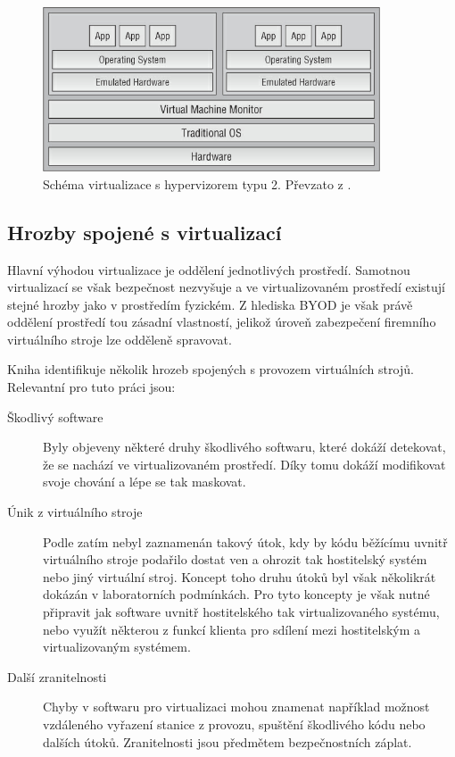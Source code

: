 \begin{figure}[h!]
\centering
\includegraphics[width=10cm]{img/shackleford2}
\caption{Schéma virtualizace s hypervizorem typu 2. Převzato z \cite{Shackleford}.} 
\end{figure}

\subsection{Hrozby spojené s virtualizací}
Hlavní výhodou virtualizace je oddělení jednotlivých prostředí. Samotnou virtualizací se však bezpečnost nezvyšuje a ve virtualizovaném prostředí existují stejné hrozby jako v prostředím fyzickém. Z hlediska BYOD je však právě oddělení prostředí tou zásadní vlastností, jelikož úroveň zabezpečení firemního virtuálního stroje lze odděleně spravovat.

Kniha \cite{Shackleford} identifikuje několik hrozeb spojených s provozem virtuálních strojů. Relevantní pro tuto práci jsou:

\begin{description}
  \item[Škodlivý software] Byly objeveny některé druhy škodlivého softwaru, které dokáží detekovat, že se nachází ve virtualizovaném prostředí. Díky tomu dokáží modifikovat svoje chování a lépe se tak maskovat.
  \item[Únik z virtuálního stroje] Podle \cite{Shackleford} zatím nebyl zaznamenán takový útok, kdy by kódu běžícímu uvnitř virtuálního stroje podařilo dostat ven a ohrozit tak hostitelský systém nebo jiný virtuální stroj. Koncept toho druhu útoků byl však několikrát dokázán v laboratorních podmínkách. Pro tyto koncepty je však nutné připravit jak software uvnitř hostitelského tak virtualizovaného systému, nebo využít některou z funkcí klienta pro sdílení mezi hostitelským a virtualizovaným systémem.
  \item[Další zranitelnosti] Chyby v softwaru pro virtualizaci mohou znamenat například možnost vzdáleného vyřazení stanice z provozu, spuštění škodlivého kódu nebo dalších útoků. Zranitelnosti jsou předmětem bezpečnostních záplat.
\end{description}


